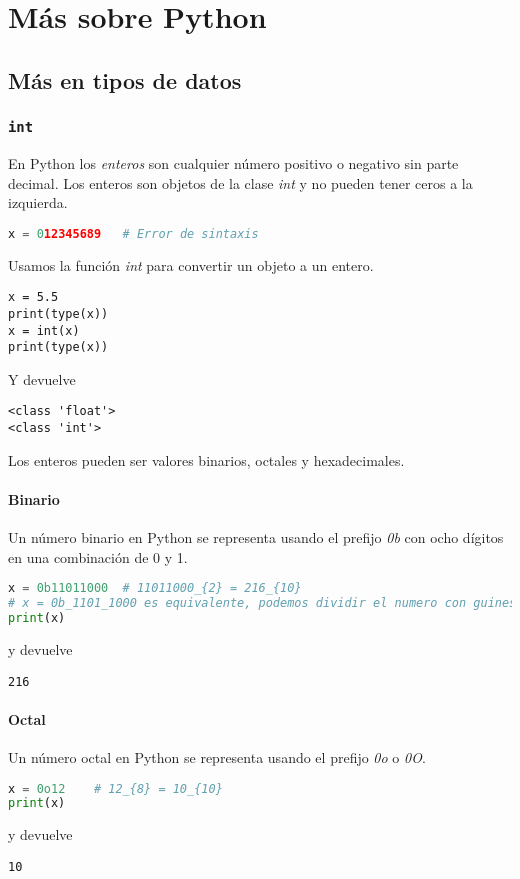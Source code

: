 \section{Más sobre Python}
	\subsection{Más en tipos de datos}
    \subsubsection{\texttt{int}}\label{subsubsec: int}
    En Python los \emph{enteros} son cualquier número positivo o negativo sin parte decimal. Los enteros son objetos de la clase \emph{int} y no pueden tener ceros a la izquierda.
    \begin{lstlisting}[language = {python}]
x = 012345689   # Error de sintaxis
    \end{lstlisting}
    Usamos la función \emph{int} para convertir un objeto a un entero.
    \begin{lstlisting}[language = {[latex]tex}]
x = 5.5
print(type(x))
x = int(x)
print(type(x))
    \end{lstlisting}
    Y devuelve
    \begin{lstlisting}[language = {[latex]tex}]
<class 'float'>
<class 'int'>
    \end{lstlisting}
    Los enteros pueden ser valores binarios, octales y hexadecimales.
    \paragraph{Binario} Un número binario en Python se representa usando el prefijo \emph{0b} con ocho dígitos en una combinación de 0 y 1.
    \begin{lstlisting}[language={python}]
x = 0b11011000  # 11011000_{2} = 216_{10}
# x = 0b_1101_1000 es equivalente, podemos dividir el numero con guines bajos sin problema
print(x)
    \end{lstlisting}
    y devuelve
    \begin{lstlisting}[language={[latex]tex}]
216
    \end{lstlisting}
    \paragraph{Octal} Un número octal en Python se representa usando el prefijo \emph{0o} o \emph{0O}.
    \begin{lstlisting}[language={python}]
x = 0o12    # 12_{8} = 10_{10}
print(x)
    \end{lstlisting}
    y devuelve
    \begin{lstlisting}[language={[latex]tex}]
10
    \end{lstlisting}
